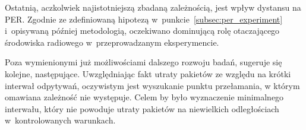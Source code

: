 Ostatnią, aczkolwiek najistotniejszą zbadaną zależnością, jest wpływ dystansu na \gls{PER}. Zgodnie ze zdefiniowaną
hipotezą w~punkcie~\ref{subsec:per_experiment} i~opisywaną później metodologią, oczekiwano dominującą rolę otaczającego
środowiska radiowego w~przeprowadzanym eksperymencie.











Poza wymienionymi już możliwościami dalszego rozwoju badań, sugeruje się kolejne, następujące. Uwzględniając fakt utraty pakietów
ze względu na krótki interwał odpytywań, oczywistym jest wyszukanie punktu przełamania, w którym omawiana zależność nie występuje.
Celem by było wyznaczenie minimalnego interwału, który nie powoduje utraty pakietów na niewielkich odległościach w~kontrolowanych
warunkach.
